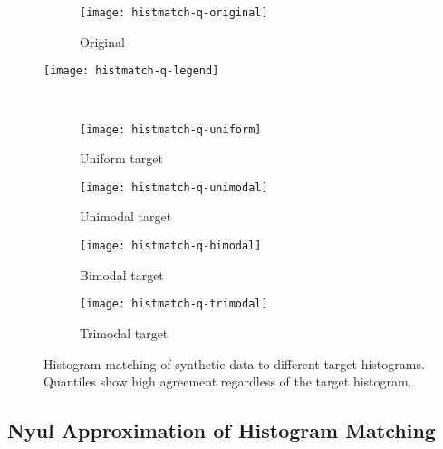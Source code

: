 \begin{figure}
  \centering
  \begin{subfigure}{\plotwidth}\texttt{[image: histmatch-q-original]}\caption{Original}\end{subfigure}
  \parbox[c]{\plotwidth}{\texttt{[image: histmatch-q-legend]}}\\
  \begin{subfigure}{\plotwidth}\texttt{[image: histmatch-q-uniform]} \caption{Uniform target} \end{subfigure}
  \begin{subfigure}{\plotwidth}\texttt{[image: histmatch-q-unimodal]}\caption{Unimodal target}\end{subfigure}
  \begin{subfigure}{\plotwidth}\texttt{[image: histmatch-q-bimodal]} \caption{Bimodal target} \end{subfigure}
  \begin{subfigure}{\plotwidth}\texttt{[image: histmatch-q-trimodal]}\caption{Trimodal target}\end{subfigure}
  \caption{Histogram matching of synthetic data to different target histograms. Quantiles show high agreement regardless of the target histogram.}
  \label{fig:hm-vs-he}
\end{figure}
\subsection{Nyul Approximation of Histogram Matching}\label{ss:nyul-approx}

